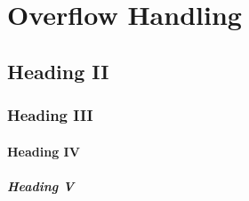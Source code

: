 \section{Overflow Handling}
\subsection{Heading II}
\subsubsection{Heading III}
\paragraph{Heading IV}
\subparagraph{Heading V}
